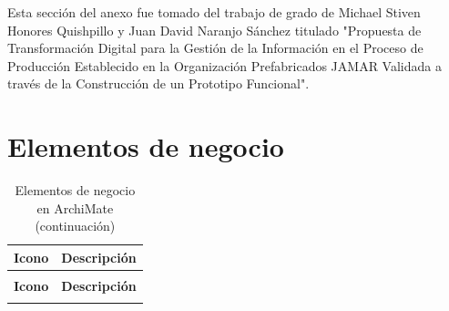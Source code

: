 \noindent
Esta sección del anexo fue tomado del trabajo de grado de Michael Stiven Honores Quishpillo y Juan David Naranjo Sánchez titulado "Propuesta de Transformación Digital para la Gestión de la Información en el Proceso de Producción Establecido en la Organización Prefabricados JAMAR Validada a través de la Construcción de un Prototipo Funcional".

\section{Elementos de negocio}

\begin{longtable}{|c|p{8cm}|}
	\caption{Elementos de negocio en ArchiMate} \label{tab:elementos-negocio-archimate}                                                  \\
	\hline
	\textbf{Icono}                                                        & \textbf{Descripción}                                         \\
	\hline
	\endfirsthead

	\caption[]{Elementos de negocio en ArchiMate (continuación)}                                                                         \\
	\hline
	\textbf{Icono}                                                        & \textbf{Descripción}                                         \\
	\hline
	\endhead

	\hline
	\endfoot


\end{longtable}

